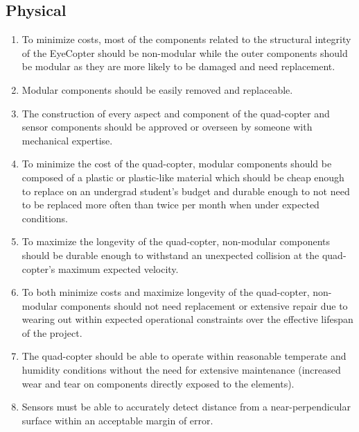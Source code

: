 \documentclass[10pt,letterpaper]{article}
\begin{document}
\subsection{Physical}
\begin{enumerate}[label=\textbf{PH\arabic*}] 

\item To minimize costs, most of the components related to the structural integrity of the EyeCopter should be non-modular while the outer components should be modular as they are more likely to be damaged and need replacement.

\item Modular components should be easily removed and replaceable.

\item The construction of every aspect and component of the quad-copter and sensor components should be approved or overseen by someone with mechanical expertise.        

\item To minimize the cost of the quad-copter, modular components should be composed of a plastic or plastic-like material which should be cheap enough to replace on an undergrad student's budget and durable enough to not need to be replaced more often than twice per month when under expected conditions.

\item To maximize the longevity of the quad-copter, non-modular components should be durable enough to withstand an unexpected collision at the quad-copter's maximum expected velocity. 

\item To both minimize costs and maximize longevity of the quad-copter, non-modular components should not need replacement or extensive repair due to wearing out within expected operational constraints over the effective lifespan of the project.


\item The quad-copter should be able to operate within reasonable temperate and humidity conditions without the need for extensive maintenance (increased wear and tear on components directly exposed to the elements).

\item Sensors must be able to accurately detect distance from a near-perpendicular surface within an acceptable margin of error.


\end{enumerate}
\end{document}
